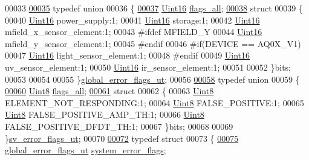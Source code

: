 \begin{DoxyCode}
00033 
\hypertarget{a00006_source_l00035}{}\hyperlink{a00006}{00035} \textcolor{keyword}{typedef} \textcolor{keyword}{union}
00036 \{
\hypertarget{a00006_source_l00037}{}\hyperlink{a00006_ab5bcfbc3ba785f199fd15527b12699f5}{00037}     \hyperlink{a00004_aae7407b021d43f7193a81a58cfb3e297}{Uint16} \hyperlink{a00006_ab5bcfbc3ba785f199fd15527b12699f5}{flags\_all};
\hypertarget{a00006_source_l00038}{}\hyperlink{a00006}{00038}     \textcolor{keyword}{struct}
00039     \{
00040         \hyperlink{a00004_aae7407b021d43f7193a81a58cfb3e297}{Uint16} power\_supply:1;
00041         \hyperlink{a00004_aae7407b021d43f7193a81a58cfb3e297}{Uint16} storage:1;
00042         \hyperlink{a00004_aae7407b021d43f7193a81a58cfb3e297}{Uint16} mfield\_x\_sensor\_element:1;
00043 \textcolor{preprocessor}{#ifdef MFIELD\_Y}
00044         \hyperlink{a00004_aae7407b021d43f7193a81a58cfb3e297}{Uint16} mfield\_y\_sensor\_element:1;
00045 \textcolor{preprocessor}{#endif}
00046 \textcolor{preprocessor}{#if(DEVICE == AQ0X\_V1)}
00047         \hyperlink{a00004_aae7407b021d43f7193a81a58cfb3e297}{Uint16} light\_sensor\_element:1;
00048 \textcolor{preprocessor}{#endif}
00049         \hyperlink{a00004_aae7407b021d43f7193a81a58cfb3e297}{Uint16} uv\_sensor\_element:1;
00050         \hyperlink{a00004_aae7407b021d43f7193a81a58cfb3e297}{Uint16} ir\_sensor\_element:1;
00051 
00052     \}bits;
00053 
00054 
00055 \}\hyperlink{a00006_d9/d38/a00166}{global\_error\_flags\_ut};
00056 
\hypertarget{a00006_source_l00058}{}\hyperlink{a00006}{00058} \textcolor{keyword}{typedef} \textcolor{keyword}{union}
00059 \{
\hypertarget{a00006_source_l00060}{}\hyperlink{a00006_a0f01d49aa613ecb0f5a785a154c7f626}{00060}     \hyperlink{a00004_a979e3e23b9a449e69ab6a8a83b6042f8}{Uint8} \hyperlink{a00006_a0f01d49aa613ecb0f5a785a154c7f626}{flags\_all};
\hypertarget{a00006_source_l00061}{}\hyperlink{a00006}{00061}     \textcolor{keyword}{struct}
00062     \{
00063         \hyperlink{a00004_a979e3e23b9a449e69ab6a8a83b6042f8}{Uint8} ELEMENT\_NOT\_RESPONDING:1;
00064         \hyperlink{a00004_a979e3e23b9a449e69ab6a8a83b6042f8}{Uint8} FALSE\_POSITIVE:1;
00065         \hyperlink{a00004_a979e3e23b9a449e69ab6a8a83b6042f8}{Uint8} FALSE\_POSITIVE\_AMP\_TH:1;
00066         \hyperlink{a00004_a979e3e23b9a449e69ab6a8a83b6042f8}{Uint8} FALSE\_POSITIVE\_DFDT\_TH:1;
00067     \}bits;
00068 
00069 \}\hyperlink{a00006_d1/da8/a00230}{sv\_error\_flags\_ut};
00070 
\hypertarget{a00006_source_l00072}{}\hyperlink{a00006}{00072} \textcolor{keyword}{typedef} \textcolor{keyword}{struct}
00073 \{
\hypertarget{a00006_source_l00075}{}\hyperlink{a00006_a7294ffc170c17b91f442d03081cb69fe}{00075}   \hyperlink{a00006_d9/d38/a00166}{global\_error\_flags\_ut}     \hyperlink{a00006_a7294ffc170c17b91f442d03081cb69fe}{system\_error\_flags};

\end{DoxyCode}
